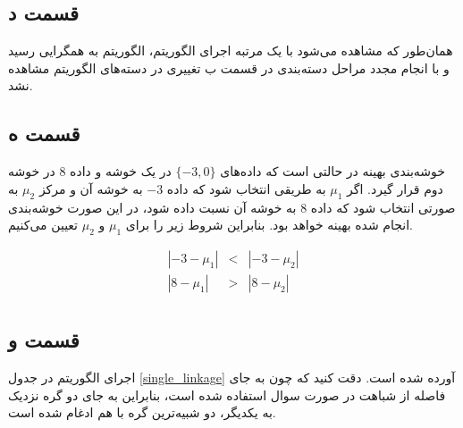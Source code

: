 \documentclass[12pt, a4paper]{article}
\begin{document}
\subsection*{قسمت د}

همان‌طور که مشاهده می‌شود با یک مرتبه اجرای الگوریتم، الگوریتم به همگرایی رسید و با انجام مجدد مراحل
دسته‌بندی در قسمت ب تغییری در دسته‌های الگوریتم مشاهده نشد.

\subsection*{قسمت ه}

خوشه‌بندی بهینه در حالتی است که داده‌های $\{-3, 0\}$ در یک خوشه و داده $8$ در خوشه دوم قرار گیرد.
اگر $\mu_1$ به طریقی انتخاب شود که داده $-3$ به خوشه آن و مرکز $\mu_2$ به صورتی
انتخاب شود که داده $8$ به خوشه آن نسبت داده شود، در این صورت خوشه‌بندی انجام شده بهینه خواهد بود.
بنابراین شروط زیر را برای $\mu_1$ و $\mu_2$ تعیین می‌کنیم.

\begin{eqnarray*}
    |-3-\mu_1| & < & |-3-\mu_2| \\
    |8-\mu_1| & > & |8-\mu_2| \\
\end{eqnarray*}

\clearpage

\subsection*{قسمت و}

اجرای الگوریتم  در جدول \ref{single_linkage} آورده شده است. دقت کنید که
چون به جای فاصله از شباهت در صورت سوال استفاده شده است، بنابراین به جای دو گره نزدیک
به یکدیگر، دو شبیه‌ترین گره با هم ادغام شده است.
\end{document}

